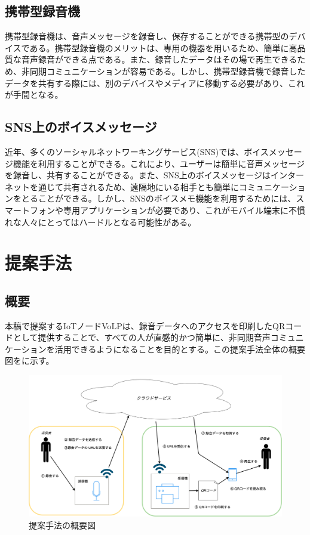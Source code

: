 \documentclass[submit,techrep,noauthor]{ipsj}
\begin{document}
\subsection{携帯型録音機}
携帯型録音機は、音声メッセージを録音し、保存することができる携帯型のデバイスである。携帯型録音機のメリットは、専用の機器を用いるため、簡単に高品質な音声録音ができる点である。また、録音したデータはその場で再生できるため、非同期コミュニケーションが容易である。しかし、携帯型録音機で録音したデータを共有する際には、別のデバイスやメディアに移動する必要があり、これが手間となる。

\subsection{SNS上のボイスメッセージ}
近年、多くのソーシャルネットワーキングサービス(SNS)では、ボイスメッセージ機能を利用することができる。これにより、ユーザーは簡単に音声メッセージを録音し、共有することができる。また、SNS上のボイスメッセージはインターネットを通じて共有されるため、遠隔地にいる相手とも簡単にコミュニケーションをとることができる。しかし、SNSのボイスメモ機能を利用するためには、スマートフォンや専用アプリケーションが必要であり、これがモバイル端末に不慣れな人々にとってはハードルとなる可能性がある。

\section{提案手法}
\label{system}
\subsection{概要}
本稿で提案するIoTノードVoLPは、録音データへのアクセスを印刷したQRコードとして提供することで、すべての人が直感的かつ簡単に、非同期音声コミュニケーションを活用できるようになることを目的とする。この提案手法全体の概要図をに示す。\par

\begin{figure}[tb]
\includegraphics[scale=0.15,bb= 0 0 2000 1000]{image/system_drawio.png}
\caption{提案手法の概要図}
\label{fig:sys-overview}
\end{figure}
\end{document}
